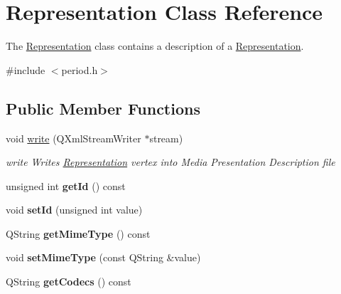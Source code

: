 \hypertarget{class_representation}{\section{Representation Class Reference}
\label{class_representation}
}


The \hyperlink{class_representation}{Representation} class contains a description of a \hyperlink{class_representation}{Representation}.  




{\ttfamily \#include $<$period.\-h$>$}

\subsection*{Public Member Functions}
\begin{DoxyCompactItemize}
\item 
void \hyperlink{class_representation_a0befd1aad26c098b99070a59a4d5b10e}{write} (Q\-Xml\-Stream\-Writer $\ast$stream)
\begin{DoxyCompactList}\small\item\em write Writes \hyperlink{class_representation}{Representation} vertex into Media Presentation Description file \end{DoxyCompactList}\item 
\hypertarget{class_representation_afd732c9b77d61d051cb2f4e6dfc1f3b5}{unsigned int {\bfseries get\-Id} () const }\label{class_representation_afd732c9b77d61d051cb2f4e6dfc1f3b5}

\item 
\hypertarget{class_representation_aed538f97ef8c89ed0b30113454cbd73f}{void {\bfseries set\-Id} (unsigned int value)}\label{class_representation_aed538f97ef8c89ed0b30113454cbd73f}

\item 
\hypertarget{class_representation_a93772fa1b471c4b12bad64f8ab0846a3}{Q\-String {\bfseries get\-Mime\-Type} () const }\label{class_representation_a93772fa1b471c4b12bad64f8ab0846a3}

\item 
\hypertarget{class_representation_a1c2eb5b39b782c60880f0f06ae977837}{void {\bfseries set\-Mime\-Type} (const Q\-String \&value)}\label{class_representation_a1c2eb5b39b782c60880f0f06ae977837}

\item 
\hypertarget{class_representation_a4b1e758aa922f79e52b80311de331230}{Q\-String {\bfseries get\-Codecs} () const }\label{class_representation_a4b1e758aa922f79e52b80311de331230}


\end{DoxyCompactItemize}
